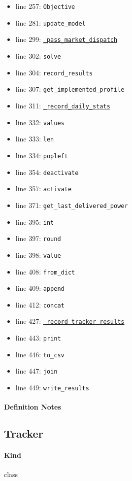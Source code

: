 \documentclass[11pt]{report}
\begin{document}
\begin{itemize}[leftmargin=*]
  \item line 257: \texttt{Objective}
  \item line 281: \texttt{update\_model}
  \item line 299: \hyperref[def:tracker.py:Tracker._pass_market_dispatch:L338]{\texttt{\_pass\_market\_dispatch}}
  \item line 302: \texttt{solve}
  \item line 304: \texttt{record\_results}
  \item line 307: \texttt{get\_implemented\_profile}
  \item line 311: \hyperref[def:tracker.py:Tracker._record_daily_stats:L315]{\texttt{\_record\_daily\_stats}}
  \item line 332: \texttt{values}
  \item line 333: \texttt{len}
  \item line 334: \texttt{popleft}
  \item line 354: \texttt{deactivate}
  \item line 357: \texttt{activate}
  \item line 371: \texttt{get\_last\_delivered\_power}
  \item line 395: \texttt{int}
  \item line 397: \texttt{round}
  \item line 398: \texttt{value}
  \item line 408: \texttt{from\_dict}
  \item line 409: \texttt{append}
  \item line 412: \texttt{concat}
  \item line 427: \hyperref[def:tracker.py:Tracker._record_tracker_results:L375]{\texttt{\_record\_tracker\_results}}
  \item line 443: \texttt{print}
  \item line 446: \texttt{to\_csv}
  \item line 447: \texttt{join}
  \item line 449: \texttt{write\_results}
\end{itemize}
\paragraph{Definition Notes}
\subsection{Tracker}
\label{def:tracker.py:Tracker:L19}
\paragraph{Kind} class
\end{document}
